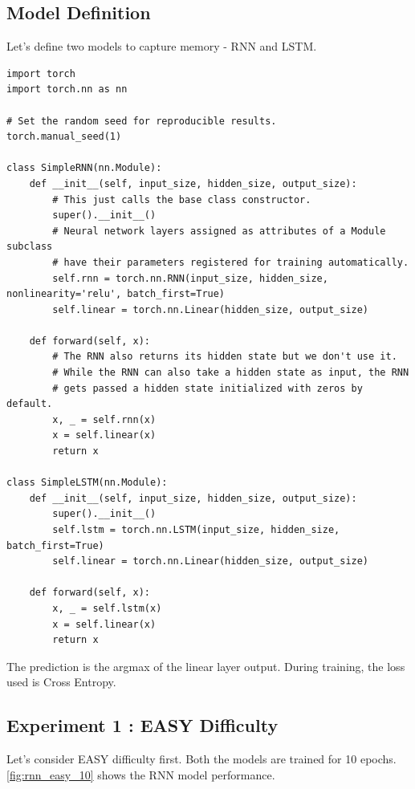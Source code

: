 \subsection{Model Definition}
Let's define two models to capture memory - RNN and LSTM. 
\begin{verbatim}
import torch
import torch.nn as nn

# Set the random seed for reproducible results.
torch.manual_seed(1)

class SimpleRNN(nn.Module):
    def __init__(self, input_size, hidden_size, output_size):
        # This just calls the base class constructor.
        super().__init__()
        # Neural network layers assigned as attributes of a Module subclass
        # have their parameters registered for training automatically.
        self.rnn = torch.nn.RNN(input_size, hidden_size, nonlinearity='relu', batch_first=True)
        self.linear = torch.nn.Linear(hidden_size, output_size)

    def forward(self, x):
        # The RNN also returns its hidden state but we don't use it.
        # While the RNN can also take a hidden state as input, the RNN
        # gets passed a hidden state initialized with zeros by default.
        x, _ = self.rnn(x)
        x = self.linear(x)
        return x
    
class SimpleLSTM(nn.Module):
    def __init__(self, input_size, hidden_size, output_size):
        super().__init__()
        self.lstm = torch.nn.LSTM(input_size, hidden_size, batch_first=True)
        self.linear = torch.nn.Linear(hidden_size, output_size)

    def forward(self, x):
        x, _ = self.lstm(x)
        x = self.linear(x)
        return x
\end{verbatim}
The prediction is the argmax of the linear layer output.
During training, the loss used is Cross Entropy.

\subsection{Experiment 1 : EASY Difficulty}
Let's consider EASY difficulty first. Both the models are trained for 10 epochs. \cref{fig:rnn_easy_10} shows the RNN model performance.

